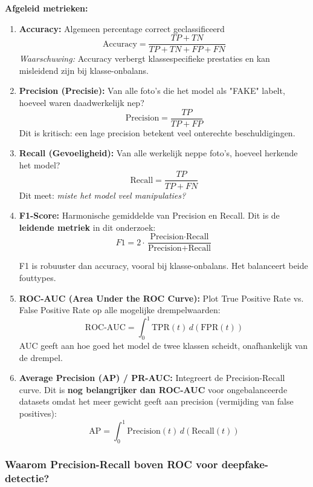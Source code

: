 \textbf{Afgeleid metrieken:}

\begin{enumerate}
    \item \textbf{Accuracy:} Algemeen percentage correct geclassificeerd
    $$\text{Accuracy} = \frac{TP + TN}{TP + TN + FP + FN}$$
    \textit{Waarschuwing:} Accuracy verbergt klassespecifieke prestaties en kan misleidend zijn bij klasse-onbalans.
    
    \item \textbf{Precision (Precisie):} Van alle foto's die het model als "FAKE" labelt, hoeveel waren daadwerkelijk nep?
    $$\text{Precision} = \frac{TP}{TP + FP}$$
    Dit is kritisch: een lage precision betekent veel onterechte beschuldigingen.
    
    \item \textbf{Recall (Gevoeligheid):} Van alle werkelijk neppe foto's, hoeveel herkende het model?
    $$\text{Recall} = \frac{TP}{TP + FN}$$
    Dit meet: \textit{miste het model veel manipulaties?}
    
    \item \textbf{F1-Score:} Harmonische gemiddelde van Precision en Recall. Dit is de \textbf{leidende metriek} in dit onderzoek:
    $$F1 = 2 \cdot \frac{\text{Precision} \cdot \text{Recall}}{\text{Precision} + \text{Recall}}$$
    
    F1 is robuuster dan accuracy, vooral bij klasse-onbalans. Het balanceert beide fouttypes.
    
    \item \textbf{ROC-AUC (Area Under the ROC Curve):} Plot True Positive Rate vs. False Positive Rate op alle mogelijke drempelwaarden:
    $$\text{ROC-AUC} = \int_0^1 \text{TPR}(t) \, d(\text{FPR}(t))$$
    AUC geeft aan hoe goed het model de twee klassen scheidt, onafhankelijk van de drempel.
    
    \item \textbf{Average Precision (AP) / PR-AUC:} Integreert de Precision-Recall curve. Dit is \textbf{nog belangrijker dan ROC-AUC} voor ongebalanceerde datasets omdat het meer gewicht geeft aan precision (vermijding van false positives):
    $$\text{AP} = \int_0^1 \text{Precision}(t) \, d(\text{Recall}(t))$$
\end{enumerate}

\subsubsection{Waarom Precision-Recall boven ROC voor deepfake-detectie?}

